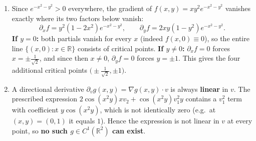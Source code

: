 \begin{exercisesolution}
\label{sol:directional_derivatives_computation}
\begin{enumerate}[label=\textbf{(\alph*)}]
  \item Since $e^{-x^2-y^2} > 0$ everywhere, the gradient of $f(x,y) = xy^2e^{-x^2-y^2}$ vanishes
    exactly where its two factors below vanish:
    \[
    \partial_x f = y^2(1-2x^2)e^{-x^2-y^2}, \qquad \partial_y f = 2xy(1-y^2)e^{-x^2-y^2}.
    \]
    \textbf{If $y=0$:} both partials vanish for every $x$ (indeed $f(x,0) \equiv 0$), so the
    entire line $\{(x,0) : x \in \mathbb{R}\}$ consists of critical points.
    \textbf{If $y \neq 0$:} $\partial_x f = 0$ forces $x = \pm\tfrac{1}{\sqrt2}$, and since then
    $x \neq 0$, $\partial_y f = 0$ forces $y = \pm 1$. This gives the four additional critical
    points $\big(\pm\tfrac{1}{\sqrt2}, \pm 1\big)$.
  \item A directional derivative $\partial_v g(x,y) = \nabla g(x,y)\cdot v$ is always
    \textbf{linear} in $v$. The prescribed expression
    $2\cos(x^2y)xv_2 + \cos(x^2y)v_1^2 y$ contains a $v_1^2$ term with coefficient
    $y\cos(x^2y)$, which is not identically zero (e.g.\ at $(x,y)=(0,1)$ it equals $1$). Hence
    the expression is not linear in $v$ at every point, so \textbf{no such $g \in C^1(\mathbb{R}^2)$
    can exist}.
\end{enumerate}
\end{exercisesolution}

